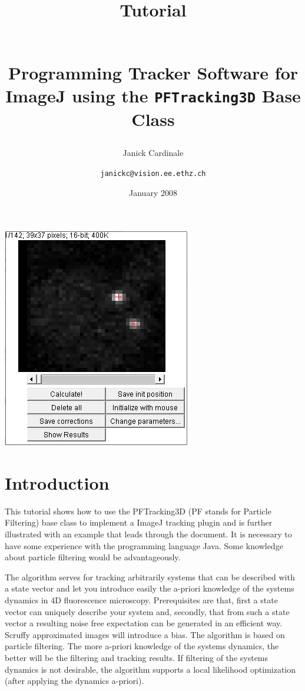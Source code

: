 \documentclass{scrartcl}
\begin{document}
\begin{titlepage}
\title{\begin{normalsize}Tutorial\end{normalsize} \\ Programming Tracker Software for ImageJ using the \texttt{PFTracking3D} Base Class}
\date{January 2008}
\author{Janick Cardinale \and \texttt{janickc@vision.ee.ethz.ch}}
\maketitle
\vspace{3cm}
\begin{center}
\includegraphics[width=.5\textwidth]{images/sampleTrack.png}
\end{center}
\thispagestyle{empty}
\newpage
\end{titlepage}
\setcounter{page}{1}

\tableofcontents

\section{Introduction}
\label{sec:introduction}
This tutorial shows how to use the PFTracking3D (PF stands for Particle Filtering) base class to implement a ImageJ tracking plugin and is further illustrated with an example that leads through the document. It is necessary to have some experience with the programming language Java. Some knowledge about particle filtering would be advantageously. 

The algorithm serves for tracking arbitrarily systems that can be described with a state vector and let you introduce easily the a-priori knowledge of the systems dynamics in 4D fluorescence microscopy. Prerequisites are that, first a state vector can uniquely describe your system and, secondly, that from such a state vector a resulting noise free expectation can be generated in an efficient way. Scruffy approximated images will introduce a bias. The algorithm is based on particle filtering. The more a-priori knowledge of the systems dynamics, the better will be the filtering and tracking results. If filtering of the systems dynamics is not desirable, the algorithm supports a local likelihood optimization (after applying the dynamics a-priori).
\end{document}
